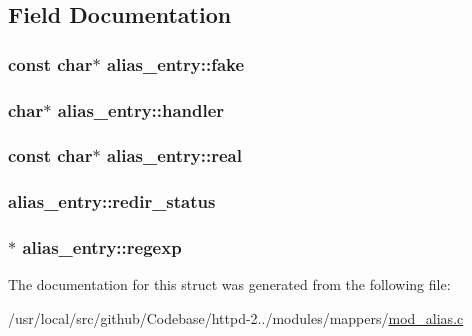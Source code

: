 \subsection{Field Documentation}
\subsubsection[{\texorpdfstring{fake}{fake}}]{\setlength{\rightskip}{0pt plus 5cm}const char$\ast$ alias\+\_\+entry\+::fake}\hypertarget{structalias__entry_ad9df3319f69e08346dc3dc578b640e5c}{}\label{structalias__entry_ad9df3319f69e08346dc3dc578b640e5c}
\subsubsection[{\texorpdfstring{handler}{handler}}]{\setlength{\rightskip}{0pt plus 5cm}char$\ast$ alias\+\_\+entry\+::handler}\hypertarget{structalias__entry_aa860e23eb680b00acbc455eb68b0293c}{}\label{structalias__entry_aa860e23eb680b00acbc455eb68b0293c}
\subsubsection[{\texorpdfstring{real}{real}}]{\setlength{\rightskip}{0pt plus 5cm}const char$\ast$ alias\+\_\+entry\+::real}\hypertarget{structalias__entry_a73e7d20af61e3e8041d0d04a16d8dfc8}{}\label{structalias__entry_a73e7d20af61e3e8041d0d04a16d8dfc8}
\subsubsection[{\texorpdfstring{redir\+\_\+status}{redir_status}}]{ alias\+\_\+entry\+::redir\+\_\+status}\hypertarget{structalias__entry_a4c12c488d4159b7221d7e9cfbc1d4f0e}{}\label{structalias__entry_a4c12c488d4159b7221d7e9cfbc1d4f0e}
\subsubsection[{\texorpdfstring{regexp}{regexp}}]{$\ast$ alias\+\_\+entry\+::regexp}\hypertarget{structalias__entry_a5b080d2abe5dc70fc7c652981fd491b8}{}\label{structalias__entry_a5b080d2abe5dc70fc7c652981fd491b8}


The documentation for this struct was generated from the following file\+:\begin{DoxyCompactItemize}
\item 
/usr/local/src/github/\+Codebase/httpd-\/2../modules/mappers/\hyperlink{mod__alias_8c}{mod\+\_\+alias.\+c}\end{DoxyCompactItemize}
